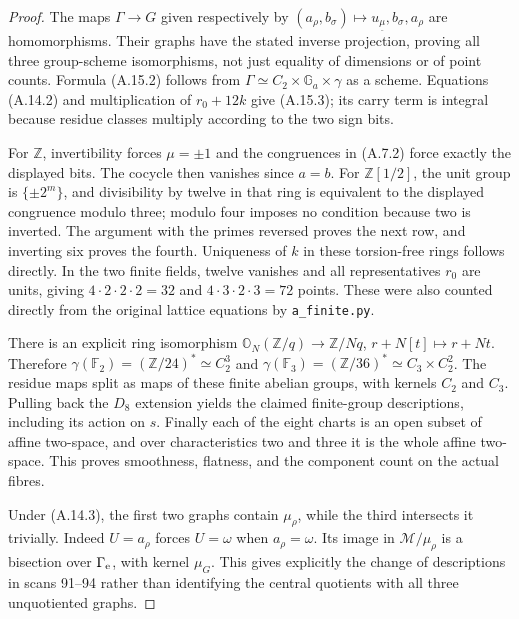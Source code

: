 \begin{proof}
The maps $\Gamma\to G$ given respectively by
$(a_\rho,b_\sigma)\mapsto u_{\underline\mu},b_\sigma,a_\rho$
are homomorphisms. Their graphs have the stated inverse projection,
proving all three group-scheme isomorphisms, not just equality of
dimensions or of point counts. Formula (A.15.2) follows from
$\Gamma\simeq C_2\times\mathbb G_a\times\gamma$ as a scheme.
Equations (A.14.2) and multiplication of
$r_0+12k$ give (A.15.3); its carry term is integral because residue
classes multiply according to the two sign bits.

For $\mathbb Z$, invertibility forces $\mu=\pm1$ and the congruences
in (A.7.2) force exactly the displayed bits. The cocycle then vanishes
since $a=b$. For $\mathbb Z[1/2]$, the unit group is
$\{\pm2^m\}$, and divisibility by twelve in that ring is equivalent
to the displayed congruence modulo three; modulo four imposes no
condition because two is inverted. The argument with the primes
reversed proves the next row, and inverting six proves the fourth.
Uniqueness of $k$ in these torsion-free rings follows directly.
In the two finite fields, twelve vanishes and all representatives
$r_0$ are units, giving $4\cdot2\cdot2\cdot2=32$ and
$4\cdot3\cdot2\cdot3=72$ points. These were also counted directly
from the original lattice equations by \texttt{a\_finite.py}.

There is an explicit ring isomorphism
$\mathbb O_N(\mathbb Z/q)\to\mathbb Z/Nq$,
$r+N[t]\mapsto r+Nt$. Therefore
$\gamma(\mathbb F_2)=(\mathbb Z/24)^*\simeq C_2^3$ and
$\gamma(\mathbb F_3)=(\mathbb Z/36)^*\simeq C_3\times C_2^2$.
The residue maps split as maps of these finite abelian groups, with
kernels $C_2$ and $C_3$. Pulling back the $D_8$ extension yields the
claimed finite-group descriptions, including its action on $s$.
Finally each of the eight charts is an open subset of affine
two-space, and over characteristics two and three it is the whole
affine two-space. This proves smoothness, flatness, and the component
count on the actual fibres.

Under (A.14.3), the first two graphs contain $\mu_\rho$, while the
third intersects it trivially. Indeed $U=a_\rho$ forces
$U=\omega$ when $a_\rho=\omega$. Its image in
$\mathcal M/\mu_\rho$ is a bisection over $\Gamma_{\rm e}$, with
kernel $\mu_G$. This gives explicitly the change of descriptions in
scans 91--94 rather than identifying the central quotients with
all three unquotiented graphs.
\end{proof}

